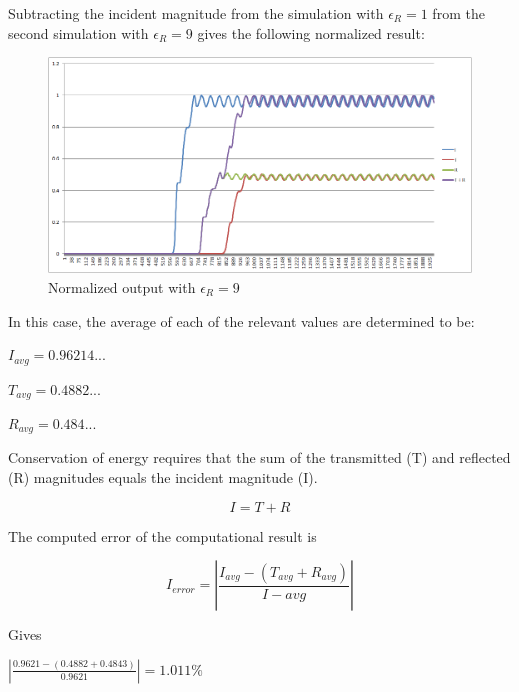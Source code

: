 Subtracting the incident magnitude from the simulation with $\epsilon_R = 1$ from the second simulation with $\epsilon_R = 9$ gives the following normalized result:

\begin{figure}[H]
	\centering
	\includegraphics[width=\textwidth,
	keepaspectratio]{pw-epsilon-9-tir-power.png}
	\caption{Normalized output with $\epsilon_R = 9$}
	\label{fig:pwEpsilon9Normalized}
\end{figure}

In this case, the average of each of the relevant values are determined to be:

\begin{center}
$I_{avg} = 0.96214...$

$T_{avg} = 0.4882...$

$R_{avg} = 0.484...$
\end{center}

Conservation of energy requires that the sum of the transmitted (T) and reflected (R) magnitudes equals the incident magnitude (I).

\begin{equation}
I = T+ R
\end{equation}

The computed error of the computational result is

\begin{equation}
I_{error} = |\frac{I_{avg} - (T_{avg} + R_{avg})}{I-{avg}}|
\end{equation}

Gives

\begin{center}
	\begin{math}
	|\frac{0.9621-(0.4882 + 0.4843)}{0.9621}| = 1.011\%
	\end{math}
\end{center}

